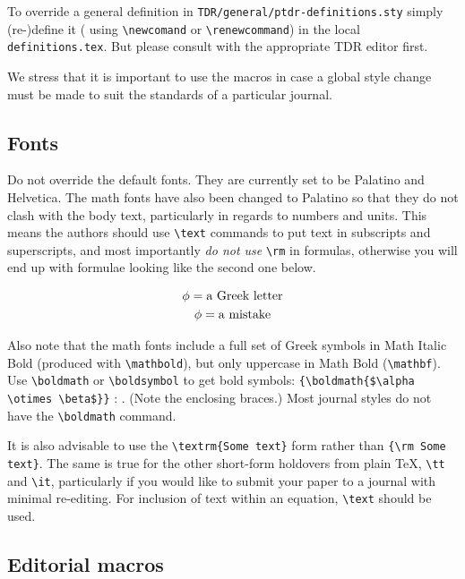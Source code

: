 To override a general definition in \texttt{TDR/general/ptdr-definitions.sty}
simply (re-)define it ( using \verb|\newcomand| or \verb|\renewcommand|) in the local \texttt{definitions.tex}. But please
consult with the appropriate TDR editor first.

We stress that it is important to use the macros in case a global style change must be made to suit the standards of a particular journal.

\subsection{Fonts}
Do not override the default fonts. They are currently set to be
Palatino and Helvetica. The math fonts have also been changed to
Palatino so that they do not clash with the body text,
particularly in regards to numbers and units. This means the
authors should use \verb|\text| commands to put text in subscripts
and superscripts, and most importantly \emph{do not use}
\verb|\rm| in formulas, otherwise you will end up with formulae looking like the second one below.

\begin{gather}
\phi = \text{a Greek letter}\\
{\rm \phi} = \text{a mistake}
\end{gather}

Also note that the math fonts include a full set of Greek symbols in Math Italic Bold (produced with \verb|\mathbold|),
but only uppercase in Math Bold (\verb|\mathbf|). Use \verb|\boldmath| or \verb|\boldsymbol| to get bold symbols: \verb|{\boldmath{$\alpha \otimes \beta$}}| : {\boldmath{$\alpha \otimes \beta$}}. (Note the enclosing braces.) Most journal styles do not have the \verb|\boldmath| command.



It is also advisable to use the \verb|\textrm{Some text}| form rather than
\verb|{\rm Some text}|. The same is true for the other short-form holdovers from plain \TeX,
\verb|\tt| and \verb|\it|, particularly if you would like to submit your paper to a journal
with minimal re-editing. For inclusion of text within an equation, \verb|\text| should be used.

\subsection{Editorial macros}



